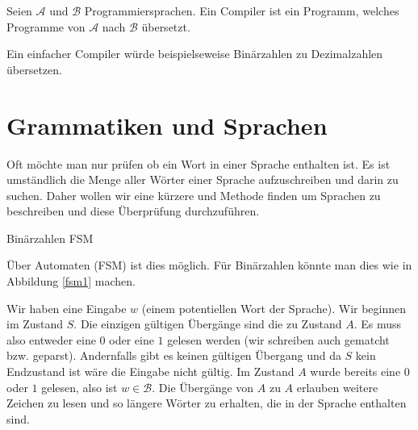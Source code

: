\begin{defn}[Compiler]
Seien $\mathcal{A}$ und $\mathcal{B}$ Programmiersprachen. Ein Compiler ist ein Programm, welches Programme von $\mathcal{A}$ nach $\mathcal{B}$ übersetzt.
\end{defn}

Ein einfacher Compiler würde beispielseweise Binärzahlen zu Dezimalzahlen übersetzen.

\section{Grammatiken und Sprachen}
Oft möchte man nur prüfen ob ein Wort in einer Sprache enthalten ist.
Es ist umständlich die Menge aller Wörter einer Sprache aufzuschreiben und darin zu suchen.
Daher wollen wir eine kürzere und Methode finden um Sprachen zu beschreiben und diese Überprüfung durchzuführen.

\begin{floatingfigure}[r]{6.5cm}
\begin{center}
\end{center}
 \caption{Binärzahlen FSM}
  \vspace{0.3cm}
 \label{fsm1}
\end{floatingfigure}

Über Automaten (FSM) ist dies möglich. Für Binärzahlen könnte man dies wie in Abbildung \ref{fsm1} machen.

Wir haben eine Eingabe $w$ (einem potentiellen Wort der Sprache).
Wir beginnen im Zustand $S$. Die einzigen gültigen Übergänge sind die zu Zustand $A$. Es muss also entweder eine $0$ oder
eine $1$ gelesen werden (wir schreiben auch gematcht bzw. geparst). Andernfalls gibt es keinen gültigen Übergang und da $S$ kein Endzustand ist wäre die Eingabe nicht gültig.
Im Zustand $A$ wurde bereits eine $0$ oder $1$ gelesen, also ist $w \in \mathcal{B}$. Die Übergänge von $A$ zu $A$ erlauben
weitere Zeichen zu lesen und so längere Wörter zu erhalten, die in der Sprache enthalten sind.

